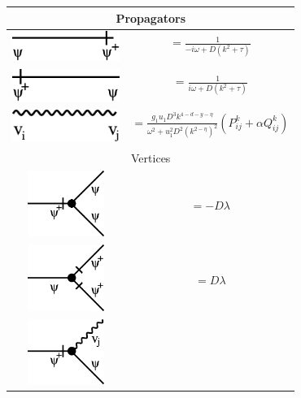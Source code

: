 \documentclass[12pt]{article}
\begin{document}
\begin{table}[!ht]
\centering
\begin{tabular}{c c}
\multicolumn{2}{c}{ Propagators }\\
\hline
\multirow{2}{*}{\includegraphics[width=3.5cm]{figure/prop1.eps}} &  $=\frac{1}{-i\omega + D(k^2+\tau)}$   \\
& \\
\multirow{2}{*}{\includegraphics[width=3.5cm]{figure/prop2.eps}} &  $=\frac{1}{i\omega + D(k^2+\tau)} $  \\
& \\
\multirow{2}{*}{\includegraphics[width=3.5cm]{figure/prop3.eps}} & $=\frac{g_1 u_1 D^3 k^{4-d-y-\eta}}{\omega^2+u_1^2D^2 (k^{2-\eta})^2}(P_{ij}^k +\alpha Q_{ij}^k)$ \\
& \\
\hline
\multicolumn{2}{c}{ Vertices }\\
\hline
\multirow{4}{*}{\includegraphics[width=2.5cm]{figure/vert1.eps}} & \\
& \multirow{2}{*}{$= - D \lambda$}\\
& \\
& \\[1ex]
\multirow{4}{*}{\includegraphics[width=2.5cm]{figure/vert2.eps}} & \\
& \multirow{2}{*}{$=D \lambda$}\\
& \\
& \\[1ex]
\multirow{4}{*}{\includegraphics[width=2.5cm]{figure/vert3.eps}} & \\

\end{tabular}
\end{table}
\end{document}
